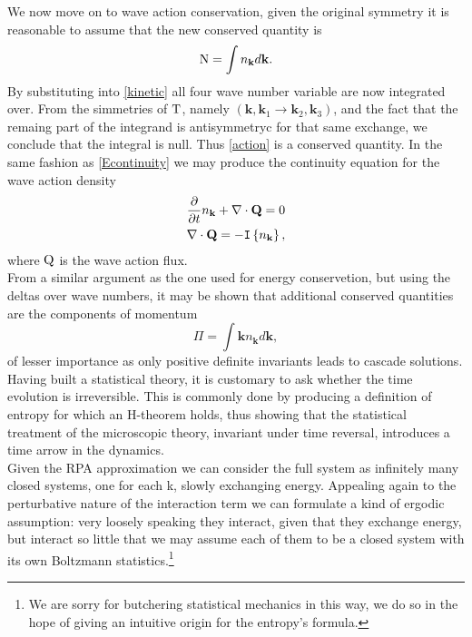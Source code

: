 We now move on to wave action conservation, given the original symmetry it is reasonable to assume that the new conserved quantity is 
\begin{equation}
    \mathrm{N} = \int n_\mathbf{k} d\mathbf{k}.
    \label{action}
\end{equation}
By substituting into \eqref{kinetic}  all four wave number variable are now integrated over. From the simmetries of  $\mathrm{T}$, 
namely $(\mathbf{k},\mathbf{k}_1 \rightarrow \mathbf{k}_2,\mathbf{k}_3)$, and the fact that the remaing part of the integrand is antisymmetryc for that same exchange, we conclude that the integral 
is null. Thus \eqref{action} is a conserved quantity. In the same fashion as \eqref{Econtinuity} we may produce the continuity equation for the wave action density
\begin{align}
    &\frac{\partial}{\partial t} n_\mathbf{k} + \nabla\cdot\mathrm{\mathbf{Q}} = 0 \label{Ncontinuity}\\
    &\nabla\cdot\mathrm{\mathbf{Q}} = -\mathtt{I}\left\{n_\mathbf{k}\right\}, 
\end{align}
where $\mathrm{Q}$ is the wave action flux. \\
From a similar argument as the one used for energy conservetion, but using the deltas over wave numbers, it may be shown that additional conserved quantities are the components of momentum
\begin{equation}
    \Pi = \int \mathbf{k} n_\mathbf{k} d\mathbf{k},
\end{equation}
of lesser importance as only positive definite invariants leads to cascade solutions. \\
Having built a statistical theory, it is customary to ask whether the time evolution is irreversible. This is commonly done by producing a definition of entropy for which
an H-theorem holds, thus showing that the statistical treatment of the microscopic theory, invariant under time reversal, introduces a time arrow in the dynamics. \\
Given the RPA approximation we can consider the full system as infinitely many closed systems, one for each k, slowly exchanging energy. Appealing again to 
the perturbative nature of the interaction term we can formulate a kind of ergodic assumption: very loosely speaking they interact, given that they exchange energy, but interact 
so little that we may assume each of them to be a closed system with its own Boltzmann statistics.\footnote{We are sorry for butchering statistical mechanics in this way, 
we do so in the hope of giving an intuitive origin for the entropy's formula.}\\ 

